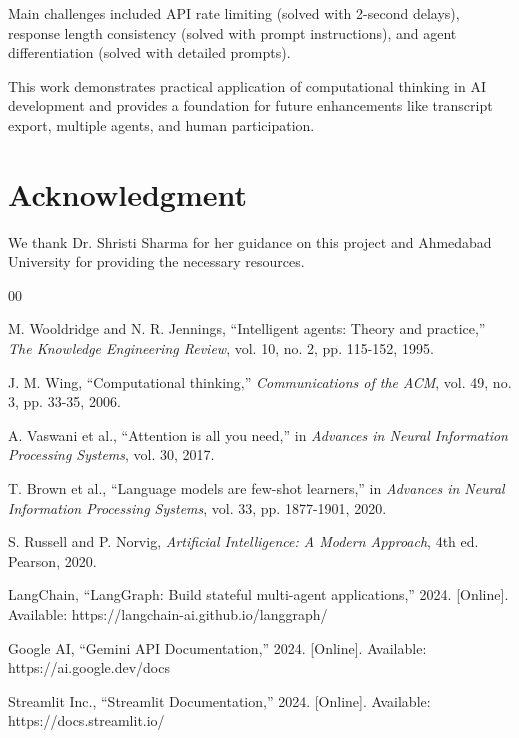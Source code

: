\documentclass[conference]{IEEEtran}
\begin{document}
Main challenges included API rate limiting (solved with 2-second delays), response length consistency (solved with prompt instructions), and agent differentiation (solved with detailed prompts).

This work demonstrates practical application of computational thinking in AI development and provides a foundation for future enhancements like transcript export, multiple agents, and human participation.

\section*{Acknowledgment}

We thank Dr. Shristi Sharma for her guidance on this project and Ahmedabad University for providing the necessary resources.

\begin{thebibliography}{00}

M. Wooldridge and N. R. Jennings, ``Intelligent agents: Theory and practice,'' \textit{The Knowledge Engineering Review}, vol. 10, no. 2, pp. 115-152, 1995.

J. M. Wing, ``Computational thinking,'' \textit{Communications of the ACM}, vol. 49, no. 3, pp. 33-35, 2006.

A. Vaswani et al., ``Attention is all you need,'' in \textit{Advances in Neural Information Processing Systems}, vol. 30, 2017.

T. Brown et al., ``Language models are few-shot learners,'' in \textit{Advances in Neural Information Processing Systems}, vol. 33, pp. 1877-1901, 2020.

S. Russell and P. Norvig, \textit{Artificial Intelligence: A Modern Approach}, 4th ed. Pearson, 2020.

LangChain, ``LangGraph: Build stateful multi-agent applications,'' 2024. [Online]. Available: https://langchain-ai.github.io/langgraph/

Google AI, ``Gemini API Documentation,'' 2024. [Online]. Available: https://ai.google.dev/docs

Streamlit Inc., ``Streamlit Documentation,'' 2024. [Online]. Available: https://docs.streamlit.io/

\end{thebibliography}
\end{document}
